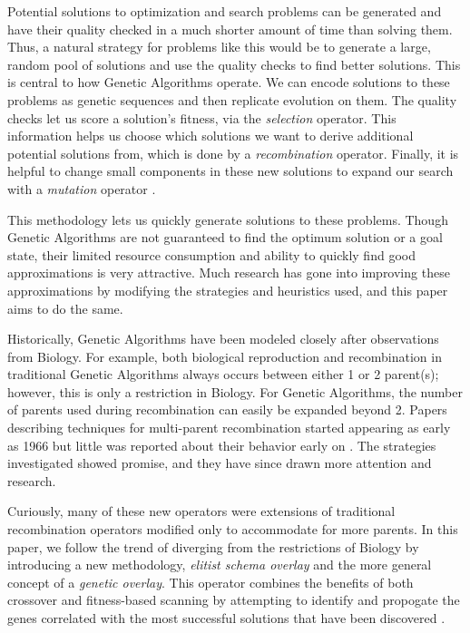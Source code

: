 Potential solutions to optimization and search problems can be generated and have their quality checked in a much shorter amount of time than solving them. Thus, a natural strategy for problems like this would be to generate a large, random pool of solutions and use the quality checks to find better solutions. This is central to how Genetic Algorithms operate. We can encode solutions to these problems as genetic sequences and then replicate evolution on them. The quality checks let us score a solution's fitness, via the \emph{selection} operator. This information helps us choose which solutions we want to derive additional potential solutions from, which is done by a \emph{recombination} operator. Finally, it is helpful to change small components in these new solutions to expand our search with a \emph{mutation} operator \cite{Deb99}.

This methodology lets us quickly generate solutions to these problems. Though Genetic Algorithms are not guaranteed to find the optimum solution or a goal state, their limited resource consumption and ability to quickly find good approximations is very attractive\cite{Russell10}. Much research has gone into improving these approximations by modifying the strategies and heuristics used, and this paper aims to do the same.

Historically, Genetic Algorithms have been modeled closely after observations from Biology. For example, both biological reproduction and recombination in traditional Genetic Algorithms always occurs between either 1 or 2 parent(s); however, this is only a restriction in Biology\cite{Eiben95}. For Genetic Algorithms, the number of parents used during recombination can easily be expanded beyond 2. Papers describing techniques for multi-parent recombination started appearing as early as 1966 but little was reported about their behavior early on \cite{Eiben03}. The strategies investigated showed promise, and they have since drawn more attention and research\cite{Eiben94}. 

Curiously, many of these new operators were extensions of traditional recombination operators modified only to accommodate for more parents. In this paper, we follow the trend of diverging from the restrictions of Biology by introducing a new methodology, \emph{elitist schema overlay} and the more general concept of a \emph{genetic overlay}. This operator combines the benefits of both crossover and fitness-based scanning by attempting to identify and propogate the genes correlated with the most successful solutions that have been discovered \cite{Russell10}. 